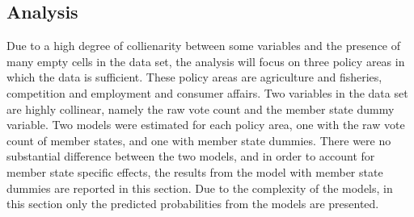 \begin{table}[ht]
  \centering
  \caption{Independent Variables}
  \label{tab:variables}
\end{table}

\subsection{Analysis}

Due to a high degree of collienarity between some variables and the presence of many empty cells in the data set, the analysis will focus on three policy areas in which the data is sufficient. These policy areas are agriculture and fisheries, competition and employment and consumer affairs. Two variables in the data set are highly collinear, namely the raw vote count and the member state dummy variable. Two models were estimated for each policy area, one with the raw vote count of member states, and one with member state dummies.  There were no substantial difference between the two models, and in order to account for member state specific effects, the results from the model with member state dummies are reported in this section. Due to the complexity of the models, in this section only the predicted probabilities from the models are presented. 

